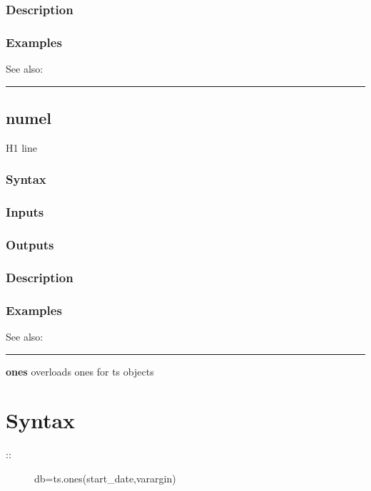 \documentclass[letterpaper,10pt,english]{sphinxmanual}
\begin{document}
\subsubsection{Description}
\label{classes/time_series/@ts/ts:id401}

\subsubsection{Examples}
\label{classes/time_series/@ts/ts:id402}
See also:


\bigskip\hrule{}\bigskip



\subsection{numel}
\label{classes/time_series/@ts/ts:numel}\label{classes/time_series/@ts/ts:id403}
H1 line


\subsubsection{Syntax}
\label{classes/time_series/@ts/ts:id404}

\subsubsection{Inputs}
\label{classes/time_series/@ts/ts:id405}

\subsubsection{Outputs}
\label{classes/time_series/@ts/ts:id406}

\subsubsection{Description}
\label{classes/time_series/@ts/ts:id407}

\subsubsection{Examples}
\label{classes/time_series/@ts/ts:id408}
See also:


\bigskip\hrule{}\bigskip

\label{classes/time_series/@ts/ts:ones}
\textbf{ones} overloads ones for ts objects


\section{Syntax}
\label{classes/time_series/@ts/ts:id409}\begin{description}
\item[{::}] \leavevmode
db=ts.ones(start\_date,varargin)

\end{description}
\end{document}
